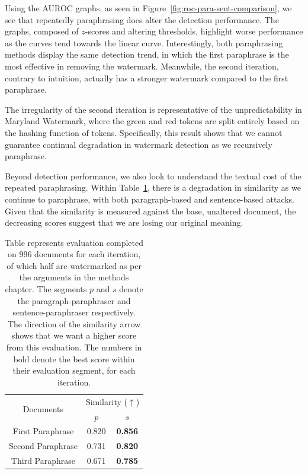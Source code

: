 \documentclass{l4proj}
\theoremstyle{definition}
\begin{document}
    Using the AUROC graphs, as seen in Figure~\ref{fig:roc-para-sent-comparison}, we see that repeatedly paraphrasing does alter the detection performance. The graphs, composed of $z$-scores and altering thresholds, highlight worse performance as the curves tend towards the linear curve. Interestingly, both paraphrasing methods display the same detection trend, in which the first paraphrase is the most effective in removing the watermark. Meanwhile, the second iteration, contrary to intuition, actually has a stronger watermark compared to the first paraphrase.

    The irregularity of the second iteration is representative of the unpredictability in Maryland Watermark, where the green and red tokens are split entirely based on the hashing function of tokens. Specifically, this result shows that we cannot guarantee continual degradation in watermark detection as we recursively paraphrase. 

    Beyond detection performance, we also look to understand the textual cost of the repeated paraphrasing. Within Table~\ref{table:recursive-paraphrase-table}, there is a degradation in similarity as we continue to paraphrase, with both paragraph-based and sentence-based attacks. Given that the similarity is measured against the base, unaltered document, the decreasing scores suggest that we are losing our original meaning.

    \begin{table}[ht]
        \centering
        \begin{tabular}{c|cc}
        \multirow{2}{*}{Documents}  & \multicolumn{2}{c}{Similarity ($\uparrow$)} \\ \cline{2-3} 
        & \multicolumn{1}{c|}{$p$} & $s$ \\ \hline
        First Paraphrase & 0.820 & \textbf{0.856} \\
        Second Paraphrase & 0.731 & \textbf{0.820} \\
        Third Paraphrase & 0.671 & \textbf{0.785} 
        \end{tabular}
        \caption{Table represents evaluation completed on 996 documents for each iteration, of which half are watermarked as per the arguments in the methods chapter. The segments $p$ and $s$ denote the paragraph-paraphraser and sentence-paraphraser respectively. The direction of the similarity arrow shows that we want a higher score from this evaluation. The numbers in bold denote the best score within their evaluation segment, for each iteration.}
        \label{table:recursive-paraphrase-table}
    \end{table}
\end{document}

